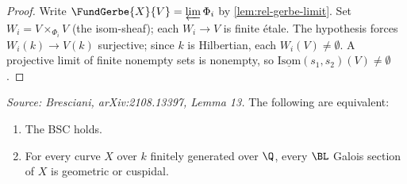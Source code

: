 \begin{proof}
  Write \(\FundGerbe{X}{V} = \varprojlim \Phi_i\) by \cref{lem:rel-gerbe-limit}.
  Set \(W_i = V \times_{\Phi_i} V\) (the isom-sheaf); each \(W_i \to V\) is finite
  étale. The hypothesis forces \(W_i(k) \to V(k)\) surjective; since \(k\) is
  Hilbertian, each \(W_i(V) \neq \emptyset\). A projective limit of finite nonempty
  sets is nonempty, so \(\underline{\mathrm{Isom}}(s_1, s_2)(V) \neq \emptyset\).
\end{proof}

\begin{lemma}[BiratEquiv]
  \label{lem:bireq}
  \textit{Source: Bresciani, arXiv:2108.13397, Lemma 13.}
  The following are equivalent:
  \begin{enumerate}
    \item The BSC holds.
    \item For every curve \(X\) over \(k\) finitely generated over \(\Q\), every
      \(\BL\) Galois section of \(X\) is geometric or cuspidal.
  \end{enumerate}
\end{lemma}

